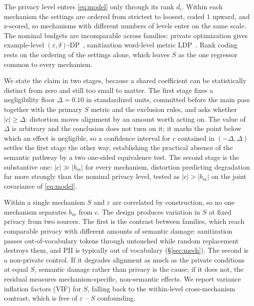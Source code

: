The privacy level enters \eqref{eq:model} only through its rank $d_i$.
Within each mechanism the settings are ordered from strictest to loosest,
coded $1$ upward,
and z-scored,
so mechanisms with different numbers of levels enter on the same scale.
The nominal budgets are incomparable across families:
private optimization gives example-level $(\varepsilon, \delta)$-DP~\citep{abadi2016deep},
sanitization word-level metric LDP~\citep{chatzikokolakis2013broadening}.
Rank coding rests on the ordering of the settings alone,
which leaves $S$ as the one regressor common to every mechanism.

We state the claim in two stages,
because a shared coefficient can be statistically distinct from zero and still too small to matter.
The first stage fixes a negligibility floor $\Delta = 0.10$ in standardized units,
committed before the main pass together with the primary $S$ metric and the exclusion rules,
and asks whether $|c| \ge \Delta$:
distortion moves alignment by an amount worth acting on.
The value of $\Delta$ is arbitrary and the conclusion does not turn on it;
it marks the point below which an effect is negligible,
so a confidence interval for $c$ contained in $(-\Delta, \Delta)$ settles the first stage the other way,
establishing the practical absence of the semantic pathway by a two one-sided equivalence test.
The second stage is the substantive one:
$|c| \gg |b_m|$ for every mechanism,
distortion predicting degradation far more strongly than the nominal privacy level,
tested as $|c| > |b_m|$ on the joint covariance of \eqref{eq:model}.

Within a single mechanism $S$ and $\varepsilon$ are correlated by construction,
so no one mechanism separates $b_m$ from $c$.
The design produces variation in $S$ at fixed privacy from two sources.
The first is the contrast between families,
which reach comparable privacy with different amounts of semantic damage:
sanitization passes out-of-vocabulary tokens through untouched while random replacement destroys them,
and PII is typically out of vocabulary (\S\ref{sec:mech}).
The second is a non-private control.
If it degrades alignment as much as the private conditions at equal $S$,
semantic damage rather than privacy is the cause;
if it does not,
the residual measures mechanism-specific, non-semantic effects.
We report variance inflation factors (VIF) for $S$,
falling back to the within-level cross-mechanism contrast,
which is free of $\varepsilon$ -- $S$ confounding.
